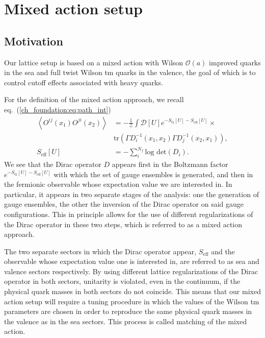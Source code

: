 \chapter{Mixed action setup}


\label{ch_ma}


\section{Motivation}
\label{ch_ma:sec:introduction}

Our lattice setup is based on a mixed action with Wilson $\mathcal{O}(a)$ improved quarks in the sea and full twist Wilson tm quarks in the valence, the goal of which is to control cutoff effects associated with heavy quarks.

For the definition of the mixed action approach, we recall eq.~(\ref{ch_foundation:eq:path_int})
\begin{align}
\left<O^{ij}(x_1)O^{ji}(x_2)\right>&=-\frac{1}{\mathcal{Z}}\int\mathcal{D}[U]e^{-S_{\textrm{G}}[U]-S_{\textrm{eff}}[U]}\times\\&{\textrm{tr}}\left(\Gamma D_i^{-1}(x_1,x_2)\Gamma D_j^{-1}(x_2,x_1)\right),\\
S_{\textrm{eff}}[U]&=-\sum_i^{N_f}\textrm{log det}(D_i).
\end{align} 
We see that the Dirac operator $D$ appears first in the Boltzmann factor $e^{-S_{\textrm{G}}[U]-S_{\textrm{eff}}[U]}$ with which the set of gauge ensembles is generated, and then in the fermionic observable whose expectation value we are interested in. In particular, it appears in two separate stages of the analysis: one the generation of gauge ensembles, the other the inversion of the Dirac operator on said gauge configurations. This in principle allows for the use of different regularizations of the Dirac operator in these two steps, which is referred to as a mixed action approach.

The two separate sectors in which the Dirac operator appear, $S_{\textrm{eff}}$ and the observable whose expectation value one is interested in, are referred to as sea and valence sectors respectively. By using different lattice regularizations of the Dirac operator in both sectors, unitarity is violated, even in the continuum, if the physical quark masses in both sectors do not coincide. This means that our mixed action setup will require a tuning procedure in which the values of the Wilson tm parameters are chosen in order to reproduce the same physical quark masses in the valence as in the sea sectors. This process is called matching of the mixed action.

